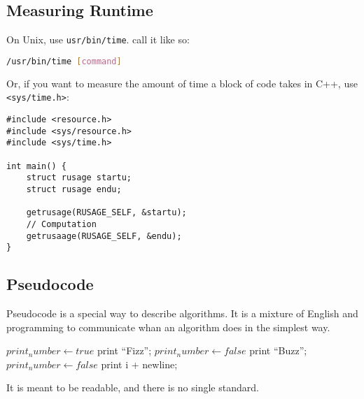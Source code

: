 \subsection{Measuring Runtime}
On Unix, use \lstinline[language=bash]{usr/bin/time}. call it like so:
\begin{lstlisting}[language=bash]
/usr/bin/time [command]
\end{lstlisting}
Or, if you want to measure the amount of time a block of code takes in C++, use \lstinline[style=C++]{<sys/time.h>}:
\begin{lstlisting}[style=C++]
#include <resource.h>
#include <sys/resource.h>
#include <sys/time.h>

int main() {
	struct rusage startu;
	struct rusage endu;

	getrusage(RUSAGE_SELF, &startu);
	// Computation
	getrusaage(RUSAGE_SELF, &endu);
}
\end{lstlisting}

\subsection{Pseudocode}
Pseudocode is a special way to describe algorithms. It is a mixture of English and programming to communicate whan an algorithm does in the simplest way.
\begin{algorithmic}
	\State $print_number \gets true$
			\State print ``Fizz'';
			\State $print_number \gets false$
		\EndIf
			\State print ``Buzz'';
			\State $print_number \gets false$
		\EndIf
			\State print i + newline;
		\EndIf
	\EndFor
\EndFunction
\end{algorithmic}
It is meant to be readable, and there is no single standard.